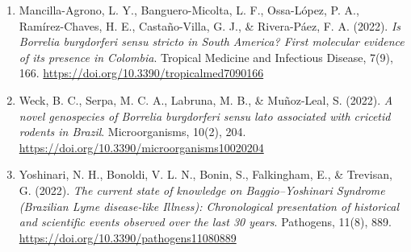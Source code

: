 \documentclass[11pt,letterpaper]{article}
\begin{document}
\begin{enumerate}
\item Mancilla-Agrono, L. Y., Banguero-Micolta, L. F., Ossa-López, P. A., Ramírez-Chaves, H. E., Castaño-Villa, G. J., \& Rivera-Páez, F. A. (2022). \textit{Is Borrelia burgdorferi sensu stricto in South America? First molecular evidence of its presence in Colombia}. Tropical Medicine and Infectious Disease, 7(9), 166. \href{https://doi.org/10.3390/tropicalmed7090166}{https://doi.org/10.3390/tropicalmed7090166}

\item Weck, B. C., Serpa, M. C. A., Labruna, M. B., \& Muñoz-Leal, S. (2022). \textit{A novel genospecies of Borrelia burgdorferi sensu lato associated with cricetid rodents in Brazil}. Microorganisms, 10(2), 204. \href{https://doi.org/10.3390/microorganisms10020204}{https://doi.org/10.3390/microorganisms10020204}

\item Yoshinari, N. H., Bonoldi, V. L. N., Bonin, S., Falkingham, E., \& Trevisan, G. (2022). \textit{The current state of knowledge on Baggio–Yoshinari Syndrome (Brazilian Lyme disease-like Illness): Chronological presentation of historical and scientific events observed over the last 30 years}. Pathogens, 11(8), 889. \href{https://doi.org/10.3390/pathogens11080889}{https://doi.org/10.3390/pathogens11080889}
\end{enumerate}
\end{document}
